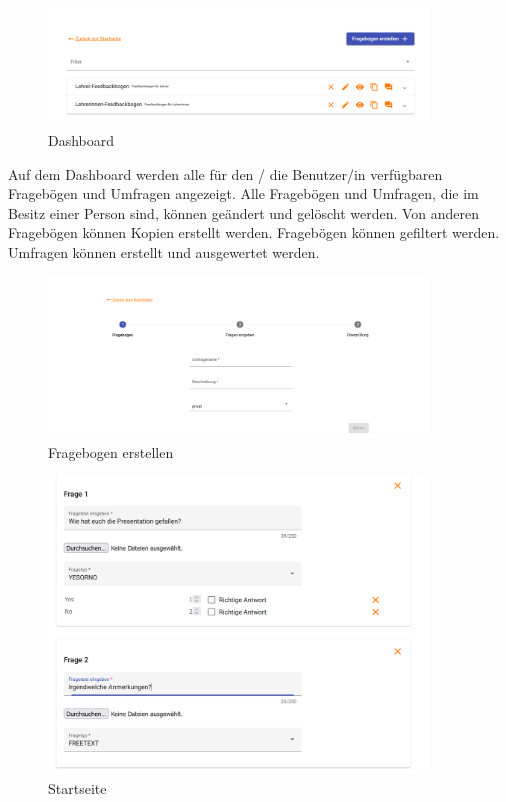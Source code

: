 \begin{figure}[H]
    \includegraphics[width=0.9\textwidth]{pics/Ergebnis_Dashboard.PNG}
    \centering
    \caption{Dashboard}
\end{figure}

Auf dem Dashboard werden alle für den / die Benutzer/in verfügbaren Fragebögen und Umfragen angezeigt.
Alle Fragebögen und Umfragen, die im Besitz einer Person sind, können geändert und gelöscht werden. Von anderen Fragebögen können 
Kopien erstellt werden. Fragebögen können gefiltert werden. Umfragen können erstellt und ausgewertet werden.

\begin{figure}[H]
    \includegraphics[width=0.9\textwidth]{pics/Ergebnis_Erstellen.PNG}
    \centering
    \caption{Fragebogen erstellen}
\end{figure}

\begin{figure}[H]
    \includegraphics[width=0.9\textwidth]{pics/Ergebnis_Erstellen2.PNG}
    \centering
    \caption{Startseite}
\end{figure}


